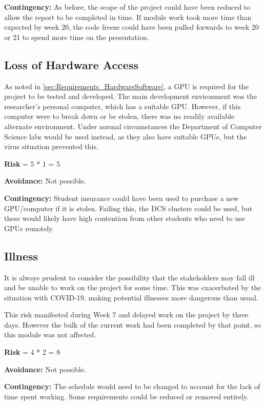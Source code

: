 \textbf{Contingency:}
As before, the scope of the project could have been reduced to allow the report to be completed in time.
If module work took more time than expected by week 20, the code freeze could have been pulled forwards to week 20 or 21 to spend more time on the presentation.


\subsection{Loss of Hardware Access}
As noted in \cref{sec:Requirements_HardwareSoftware}, a GPU is required for the project to be tested and developed.
The main development environment was the researcher's personal computer, which has a suitable GPU.
However, if this computer were to break down or be stolen, there was no readily available alternate environment.
Under normal circumstances the Department of Computer Science labs would be used instead, as they also have suitable GPUs, but the virus situation prevented this.

\textbf{Risk} = 5 * 1 = 5

\textbf{Avoidance:}
Not possible.

\textbf{Contingency:}
Student insurance could have been used to purchase a new GPU/computer if it is stolen.
Failing this, the DCS clusters could be used, but these would likely have high contention from other students who need to use GPUs remotely.

\subsection{Illness}
It is always prudent to consider the possibility that the stakeholders may fall ill and be unable to work on the project for some time.
This was exacerbated by the situation with COVID-19, making potential illnesses more dangerous than usual.

This risk manifested during Week 7 and delayed work on the project by three days.
However the bulk of the current work had been completed by that point, so this module was not affected.%

\textbf{Risk} = 4 * 2 = 8

\textbf{Avoidance:}
Not possible.

\textbf{Contingency:}
The schedule would need to be changed to account for the lack of time spent working.
Some requirements could be reduced or removed entirely.

